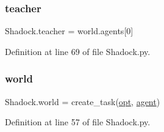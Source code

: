\subsubsection{\texorpdfstring{teacher}{teacher}}
{\footnotesize\ttfamily Shadock.\+teacher = world.\+agents\mbox{[}0\mbox{]}}



Definition at line 69 of file Shadock.\+py.

\mbox{\label{namespaceShadock_ac842a79eeebd6d6a7de512f53c36b056}} 
\subsubsection{\texorpdfstring{world}{world}}
{\footnotesize\ttfamily Shadock.\+world = create\+\_\+task(\hyperlink{namespaceShadock_ac5de26058c2175bfdfb877050f0b208e}{opt}, \hyperlink{namespaceShadock_a3455790d1c4915428cdddf6b9e46a58c}{agent})}



Definition at line 57 of file Shadock.\+py.

